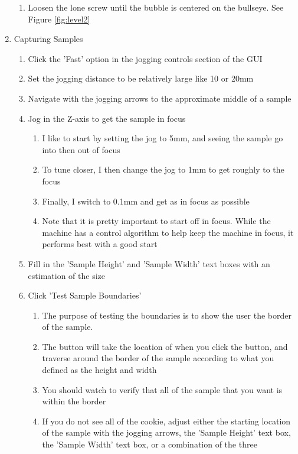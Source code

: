 \documentclass{article}
\begin{document}
\begin{outline}[enumerate]
\begin{enumerate}
\begin{enumerate}
        \item Loosen the lone screw until the bubble is centered on the bullseye. See Figure \ref{fig:level2}
		\end{enumerate}
\item Capturing Samples
    \begin{enumerate}
    \item Click the 'Fast' option in the jogging controls section of the GUI
    \item Set the jogging distance to be relatively large like 10 or 20mm
    \item Navigate with the jogging arrows to the approximate middle of a sample
    \item Jog in the Z-axis to get the sample in focus
        \begin{enumerate}
        \item I like to start by setting the jog to 5mm, and seeing the sample go into then out of focus
        \item To tune closer, I then change the jog to 1mm to get roughly to the focus
        \item Finally, I switch to 0.1mm and get as in focus as possible
        \item Note that it is pretty important to start off in focus. While the machine has a control algorithm to help keep the machine in focus, it performs best with a good start
        \end{enumerate}
    \item Fill in the 'Sample Height' and 'Sample Width' text boxes with an estimation of the size
    \item Click 'Test Sample Boundaries'
        \begin{enumerate}
        \item The purpose of testing the boundaries is to show the user the border of the sample. 
        \item The button will take the location of when you click the button, and traverse around the border of the sample according to what you defined as the height and width
        \item You should watch to verify that all of the sample that you want is within the border
        \item If you do not see all of the cookie, adjust either the starting location of the sample with the jogging arrows, the 'Sample Height' text box, the 'Sample Width' text box, or a combination of the three
        \end{enumerate}

\end{enumerate}
\end{enumerate}
\end{outline}
\end{document}
